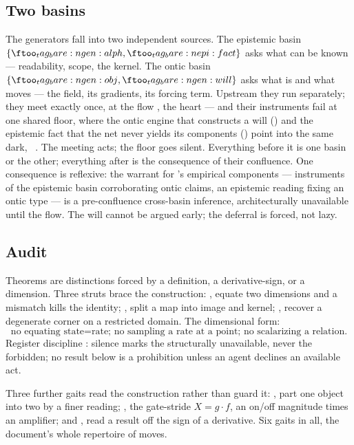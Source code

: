 \documentclass[../main]{subfiles}
\begin{document}
\subsection{Two basins}
\label{subsec:gen:basins}
%
The generators fall into two independent sources. The epistemic basin
$\{\ftag*{gen:alph},\ftag*{epi:fact}\}$ asks what can be known --- readability, scope, the
kernel. The ontic basin $\{\ftag*{gen:obj},\ftag*{gen:will}\}$ asks what is and what moves ---
the field, its gradients, its forcing term. Upstream they run separately; they meet exactly
once, at the flow , the heart --- and their instruments fail at one shared
floor, where the ontic engine that constructs a will () and the epistemic
fact that the net never yields its components () point into the same dark,
\ . The meeting acts; the floor goes silent. Everything before it is
one basin or the other; everything after is the consequence of their confluence. One
consequence is reflexive: the warrant for 's empirical components ---
instruments of the epistemic basin corroborating ontic claims, an epistemic reading
fixing an ontic type --- is a pre-confluence
cross-basin inference, architecturally unavailable until the flow. The will cannot
be argued early; the deferral is forced, not lazy.

\subsection{Audit}
\label{subsec:gen:audit}
%
Theorems are distinctions forced by a definition, a derivative-sign, or a dimension. Three
struts brace the construction: , equate two
dimensions and a mismatch kills the identity; ,
split a map into image and kernel;
, recover a degenerate corner on a restricted
domain. The dimensional form:
\begin{equation}
  \boxed{\text{no equating state}=\text{rate; no sampling a rate at a point;
         no scalarizing a relation.}}
\end{equation}
Register discipline : silence marks the
structurally unavailable, never the forbidden; no result below is a prohibition unless an
agent declines an available act.

Three further gaits read the construction rather than guard it:
, part one object into two by a finer reading;
, the gate-stride $X=g\cdot f$, an on/off
magnitude times an amplifier; and , read a
result off the sign of a derivative. Six gaits in all, the document's whole repertoire of
moves.
\end{document}
